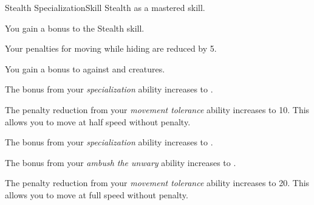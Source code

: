     \begin{feat}{Stealth Specialization}{Skill}
        \featpre Stealth as a mastered skill.

         You gain a  bonus to the Stealth skill.

         Your penalties for moving while hiding are reduced by 5.

         You gain a  bonus to  against \unaware and \partiallyunaware creatures.

         The bonus from your \textit{specialization} ability increases to .

         The penalty reduction from your \textit{movement tolerance} ability increases to 10.
        This allows you to move at half speed without penalty.

         The bonus from your \textit{specialization} ability increases to .

         The bonus from your \textit{ambush the unwary} ability increases to .

         The penalty reduction from your \textit{movement tolerance} ability increases to 20.
        This allows you to move at full speed without penalty.
    \end{feat}


